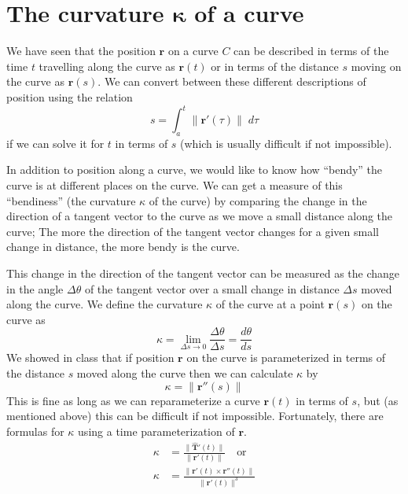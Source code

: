 \documentclass[12pt,letterpaper,fleqn]{article}
\let\oldhat\hat
\renewcommand{\hat}[1]{\oldhat{\boldsymbol{\mathbf{#1}}}}
\renewcommand{\vec}[1]{\ensuremath{\pmb{#1}}}
\begin{document}
\section*{The curvature $\pmb{\kappa}$ of a curve}
We have seen that the position $\vec{r}$ on a curve $C$ can be described in terms of the time $t$ travelling along the curve as $\vec{r}(t)$ or in terms of the distance $s$ moving on the curve as $\vec{r}(s)$. We can convert between these different descriptions of position using the relation
\begin{equation*}
 s = \int_a^t \|\vec{r}'(\tau)\|\;d\tau
\end{equation*}
if we can solve it for $t$ in terms of $s$ (which is usually difficult if not impossible).

In addition to position along a curve, we would like to know how ``bendy'' the curve is at different places on the curve. We can get a measure of this ``bendiness'' (the curvature $\kappa$ of the curve) by comparing the change in the direction of a tangent vector to the curve as we move a small distance along the curve; The more the direction of the tangent vector changes for a given small change in distance, the more bendy is the curve.

This change in the direction of the tangent vector can be measured as the change in the angle $\Delta\theta$ of the tangent vector over a small change in distance $\Delta s$ moved along the curve. We define the curvature $\kappa$ of the curve at a point $\vec{r}(s)$ on the curve as
\begin{equation}
 \kappa = \lim_{\Delta s\to 0}\frac{\Delta\theta}{\Delta s} = \frac{d\theta}{ds}\label{eqn1}
\end{equation}
We showed in class that if position $\vec{r}$ on the curve is parameterized in terms of the distance $s$ moved along the curve then we can calculate $\kappa$ by
\begin{equation}
 \kappa = \|\vec{r}''(s)\|\label{eqn2}
\end{equation}
This is fine as long as we can reparameterize a curve $\vec{r}(t)$ in terms of $s$, but (as mentioned above) this can be difficult if not impossible. Fortunately, there are formulas for $\kappa$ using a time parameterization of $\vec{r}$.
\begin{align}
  \kappa &= \frac{\|\vec{\hat{T}}'(t)\|}{\|\vec{r}'(t)\|}\quad\text{or}\label{eqn3}\\[1.25ex]
  \kappa &= \frac{\|\vec{r}'(t)\times\vec{r}''(t)\|}{\|\vec{r}'(t)\|^3}\label{eqn4}
\end{align}
\end{document}
